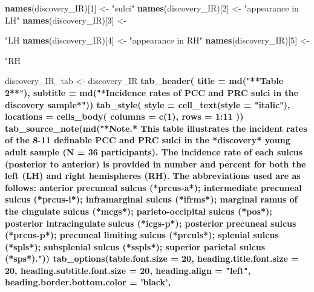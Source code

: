 \documentclass[
]{article}
\newenvironment{Shaded}{\begin{snugshade}}{\end{snugshade}}
\newcommand{\DataTypeTok}[1]{\textcolor[rgb]{0.13,0.29,0.53}{#1}}
\newcommand{\DecValTok}[1]{\textcolor[rgb]{0.00,0.00,0.81}{#1}}
\newcommand{\KeywordTok}[1]{\textcolor[rgb]{0.13,0.29,0.53}{\textbf{#1}}}
\newcommand{\NormalTok}[1]{#1}
\newcommand{\OperatorTok}[1]{\textcolor[rgb]{0.81,0.36,0.00}{\textbf{#1}}}
\newcommand{\StringTok}[1]{\textcolor[rgb]{0.31,0.60,0.02}{#1}}
\begin{document}
\begin{Shaded}
\begin{Highlighting}[]
{{\KeywordTok{names}\NormalTok{(discovery_IR)[}\DecValTok{1}\NormalTok{] <-}\StringTok{ "sulci"}
\KeywordTok{names}\NormalTok{(discovery_IR)[}\DecValTok{2}\NormalTok{] <-}\StringTok{ "appearance in LH"}
\KeywordTok{names}\NormalTok{(discovery_IR)[}\DecValTok{3}\NormalTok{] <-}\StringTok{ "LH %"}
\KeywordTok{names}\NormalTok{(discovery_IR)[}\DecValTok{4}\NormalTok{] <-}\StringTok{ "appearance in RH"}
\KeywordTok{names}\NormalTok{(discovery_IR)[}\DecValTok{5}\NormalTok{] <-}\StringTok{ "RH %"}


\NormalTok{discovery_IR_tab <-}\StringTok{ }\NormalTok{discovery_IR }\OperatorTok{%>%}\StringTok{ }\KeywordTok{gt}\NormalTok{() }\OperatorTok{%>%}
\KeywordTok{tab_header}\NormalTok{(}
  \DataTypeTok{title =} \KeywordTok{md}\NormalTok{(}\StringTok{"**Table 2**"}\NormalTok{),}
  \DataTypeTok{subtitle =} \KeywordTok{md}\NormalTok{(}\StringTok{"*Incidence rates of PCC and PRC sulci in the discovery sample*"}\NormalTok{)) }\OperatorTok{%>%}
\KeywordTok{tab_style}\NormalTok{(}
    \DataTypeTok{style =} \KeywordTok{cell_text}\NormalTok{(}\DataTypeTok{style =} \StringTok{"italic"}\NormalTok{),}
    \DataTypeTok{locations =} \KeywordTok{cells_body}\NormalTok{(}
      \DataTypeTok{columns =} \KeywordTok{c}\NormalTok{(}\DecValTok{1}\NormalTok{),}
      \DataTypeTok{rows =} \DecValTok{1}\OperatorTok{:}\DecValTok{11}
\NormalTok{    )) }\OperatorTok{%>%}
\KeywordTok{tab_source_note}\NormalTok{(}\KeywordTok{md}\NormalTok{(}\StringTok{"*Note.* This table illustrates the incident rates of the 8-11 definable PCC and PRC sulci in the *discovery* young adult sample (N = 36 participants). The incidence rate of each sulcus (posterior to anterior) is provided in number and percent for both the left (LH) and right hemispheres (RH). The abbreviations used are as follows: anterior precuneal sulcus (*prcus-a*); intermediate precuneal sulcus (*prcus-i*); inframarginal sulcus (*ifrms*); marginal ramus of the cingulate sulcus (*mcgs*); parieto-occipital sulcus (*pos*); posterior intracingulate sulcus (*icgs-p*); posterior precuneal sulcus (*prcus-p*); precuneal limiting sulcus (*prculs*); splenial sulcus (*spls*); subsplenial sulcus (*sspls*); superior parietal sulcus (*sps*)."}\NormalTok{)) }\OperatorTok{%>%}
\StringTok{  }\KeywordTok{tab_options}\NormalTok{(}\DataTypeTok{table.font.size =} \DecValTok{20}\NormalTok{,}
    \DataTypeTok{heading.title.font.size =} \DecValTok{20}\NormalTok{,}
    \DataTypeTok{heading.subtitle.font.size =} \DecValTok{20}\NormalTok{,}
    \DataTypeTok{heading.align =} \StringTok{"left"}\NormalTok{,}
    \DataTypeTok{heading.border.bottom.color =} \StringTok{'black'}\NormalTok{,}
}}}}}}}}
\end{Highlighting}
\end{Shaded}
\end{document}

